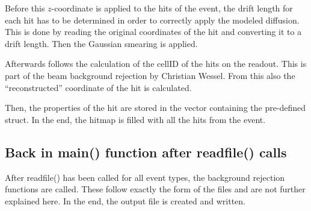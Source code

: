 Before this $z$-coordinate is applied to the hits of the event, the drift length for each hit has to be determined in order to correctly apply the modeled diffusion. This is done by reading the original coordinates of the hit and converting it to a drift length. Then the Gaussian smearing is applied. 

Afterwards follows the calculation of the cellID of the hits on the readout. This is part of the beam background rejection by Christian Wessel. From this also the \enquote{reconstructed} coordinate of the hit is calculated.

Then, the properties of the hit are stored in the vector containing the pre-defined struct.
In the end, the hitmap is filled with all the hits from the event.

\subsection*{Back in main() function after readfile() calls}
After readfile() has been called for all event types, the background rejection functions are called. These follow exactly the form of the \btwo files and are not further explained here.  In the end, the output file is created and written.